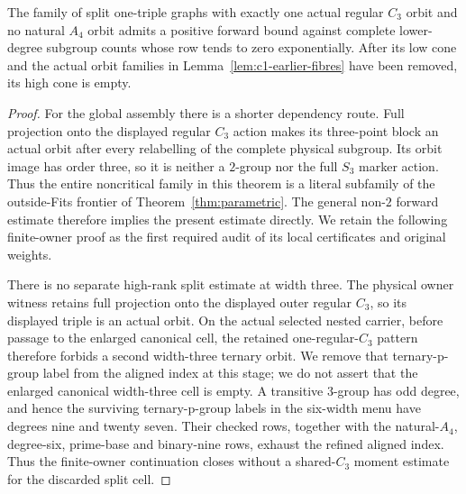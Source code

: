 \begin{theorem}\label{thm:c1-first}
The family of split one-triple graphs with exactly one actual regular
$C_3$ orbit and no natural $A_4$ orbit admits a positive forward bound
against complete lower-degree subgroup counts whose row tends to zero
exponentially. After its low cone and the actual orbit families in
Lemma~\ref{lem:c1-earlier-fibres} have been removed, its high cone
is empty.
\end{theorem}
\begin{proof}
For the global assembly there is a shorter dependency route.  Full projection
onto the displayed regular $C_3$ action makes its three-point block an actual
orbit after every relabelling of the complete physical subgroup.  Its orbit
image has order three, so it is neither a $2$-group nor the full $S_3$ marker
action.  Thus the entire noncritical family in this theorem is a literal
subfamily of the outside-\textup{Fits} frontier of
Theorem~\ref{thm:parametric}.  The general non-$2$ forward estimate therefore
implies the present estimate directly.  We retain the following finite-owner
proof as the first required audit of its local certificates and original
weights.

There is no separate high-rank split estimate at width three.  The physical
owner witness retains full projection onto the displayed outer regular
$C_3$, so its displayed triple is an actual orbit.  On the actual selected
nested carrier, before passage to the enlarged canonical cell, the retained
one-regular-$C_3$ pattern therefore forbids a second width-three ternary
orbit.  We remove that ternary-p-group label from the aligned index at this
stage; we do not assert that the enlarged canonical width-three cell is
empty.  A transitive $3$-group has odd degree, and hence the surviving
ternary-p-group labels in the six-width menu have degrees nine and twenty
seven.  Their checked rows, together with the natural-$A_4$, degree-six,
prime-base and binary-nine rows, exhaust the refined aligned index.  Thus the
finite-owner continuation closes without a shared-$C_3$ moment estimate for
the discarded split cell.


\end{proof}
